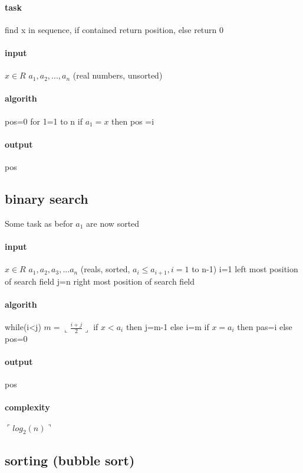 \documentclass[a4paper,10pt]{article}
\begin{document}
{\paragraph{task}
find x in sequence, if contained return position, else return 0
\paragraph{input}
$x\in R$ $a_1,a_2,...,a_n$ (real numbers, unsorted)
\paragraph{algorith}
pos=0
\newline
for 1=1 to n
\newline
if $a_1=x$ then pos =i
\paragraph{output}
pos
\subsection{binary search}
Some task as befor $a_1$ are now sorted
\paragraph{input}
$x\in R$
\newline
$a_1,a_2,a_3,...a_n$ (reals, sorted, $a_i\leq a_{i+1}, i=1$ to n-1)
\newline
i=1 left most position of search field
\newline
j=n right most position of search field
\paragraph{algorith}
while(i<j)
\newline
$m=\llcorner\frac{i+j}{2}\lrcorner$
\newline
if $x<a_i$ then j=m-1 else i=m
\newline
if $x=a_i$ then pas=i else pos=0
\paragraph{output}
pos\paragraph{complexity}
$\ulcorner log_2(n)\urcorner$
\subsection{sorting (bubble sort)}
}
\end{document}
